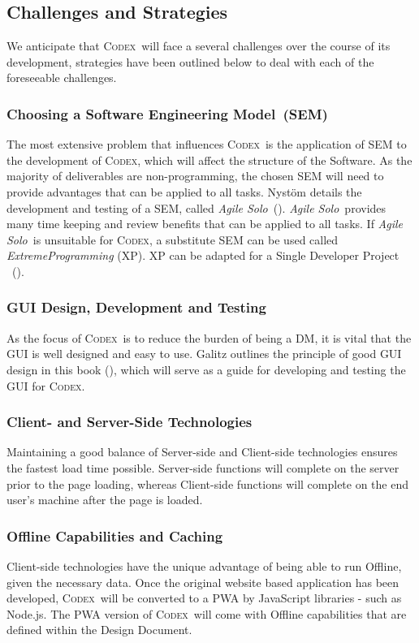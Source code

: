 \documentclass[final]{cmpreport}
\newcommand{\sem}{Software Engineering Model}
\newcommand{\Codex}{\textsc{Codex}}
\newcommand{\AgileSolo}{\emph{Agile Solo}}
\begin{document}
	\subsection{Challenges and Strategies}
	We anticipate that \Codex \ will face a several challenges over the course of its development, strategies have been outlined below to deal with each of the foreseeable challenges.	

	\subsubsection{Choosing a \sem \ (SEM)} 
	The most extensive problem that influences \Codex \ is the application of SEM to the development of \Codex, which will affect the structure of the Software. As the majority of deliverables are non-programming, the chosen SEM will need to provide advantages that can be applied to all tasks. Nyst{\"o}m details the development and testing of a SEM, called \AgileSolo \ (\cite{AgileSolo}). \AgileSolo \ provides many time keeping and review benefits that can be applied to all tasks. If \AgileSolo \ is unsuitable for \Codex, a substitute SEM can be used called \emph{ExtremeProgramming} (XP). XP can be adapted for a Single Developer Project \ (\cite{SoloXP}).
	
	\subsubsection{GUI Design, Development and Testing}
	As the focus of \Codex \ is to reduce the burden of being a DM, it is vital that the GUI is well designed and easy to use. Galitz outlines the principle of good GUI design in this book (\cite{GUIDesign}), which will serve as a guide for developing and testing the GUI for \Codex.
	
	\subsubsection{Client- and Server-Side Technologies}
	Maintaining a good balance of Server-side and Client-side technologies ensures the fastest load time possible. Server-side functions will complete on the server prior to the page loading, whereas Client-side functions will complete on the end user's machine after the page is loaded.
	
	\subsubsection{Offline Capabilities and Caching}
	Client-side technologies have the unique advantage of being able to run Offline, given the necessary data. Once the original website based application has been developed, \Codex \ will be converted to a PWA by JavaScript libraries - such as Node.js. The PWA version of \Codex \ will come with Offline capabilities that are defined within the Design Document.
	
\end{document}
